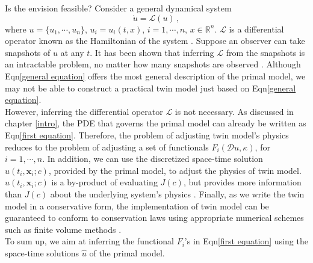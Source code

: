 \documentclass[a4paper,onecolumn]{article}
\theoremstyle{remark}
\begin{document}
\noindent Is the envision feasible? Consider a general dynamical system
\begin{equation}
    \dot{u} = \mathcal{L}(u)\,,
    \label{general equation}
\end{equation}
where $u=\{u_1,\cdots, u_n\}$, $u_i = u_i(t,x)$, $i=1,\cdots,n$, $x\in \mathbb{R}^n$.
$\mathcal{L}$ is a differential operator known as the Hamiltonian of the system 
\cite{Hamilton Fluid Dynamics}.
Suppose an observer can take snapshots of $u$ at any $t$.
It has been shown that inferring $\mathcal{L}$ from the snapshots is an intractable
problem, no matter how many snapshots are observed \cite{NP hard}.
Although Eqn\eqref{general equation} offers the most general description of the 
primal model, we may not be able to construct a practical twin model 
just based on Eqn\eqref{general equation}.\\

\noindent However, inferring the differential operator $\mathcal{L}$ 
is not necessary. As discussed in
chapter \ref{intro}, the PDE that governs the primal model 
can already be written as Eqn\eqref{first equation}. 
Therefore, the problem of adjusting twin model's physics reduces to the
problem of adjusting a set of functionals $F_i(\mathcal{D}u, \kappa)$, for 
$i=1,\cdots,n$. In addition, we can use the discretized space-time solution 
$\hat{u}(t_i,\mathbf{x}_i;c)$, provided by the primal model, to adjust the 
physics of twin model.
$\hat{u}(t_i,\mathbf{x}_i;c)$ is a by-product of evaluating $J(c)$,
but provides more information than $J(c)$ about the underlying system's physics
\cite{hanmaster}.
Finally, as we write the twin model in a conservative form, 
the implementation of twin model can be guaranteed to conform to conservation laws
using appropriate numerical schemes such as finite volume methods
\cite{numerical schemes for hyperbolic equation review}.\\

\noindent To sum up, we aim at inferring the functional $F_i$'s in Eqn\eqref{first equation}
using the space-time solutions $\hat{u}$ of the primal model.\\
\end{document}
